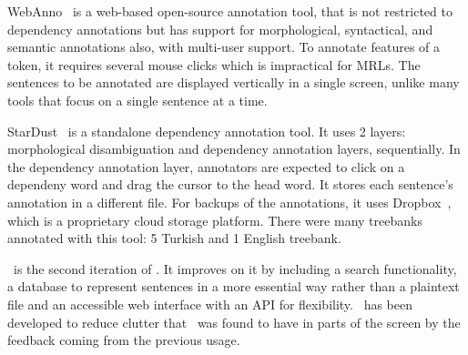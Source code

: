 WebAnno~\cite{webanno} is a web-based open-source annotation tool, that is not restricted to dependency annotations but has support for morphological, syntactical, and semantic annotations also, with multi-user support.
To annotate features of a token, it requires several mouse clicks which is impractical for MRLs.
The sentences to be annotated are displayed vertically in a single screen, unlike many tools that focus on a single sentence at a time.

StarDust~\cite{stardust} is a standalone dependency annotation tool. It uses 2 layers: morphological disambiguation and dependency annotation layers, sequentially. In the dependency annotation layer, annotators are expected to click on a dependeny word and drag the cursor to the head word. It stores each sentence's annotation in a different file. For backups of the annotations, it uses Dropbox~\cite{dropbox}, which is a proprietary cloud storage platform. There were many treebanks annotated with this tool: 5 Turkish and 1 English treebank.

\boatvtwo\ is the second iteration of \boatvone.
It improves on it by including a search functionality, a database to represent sentences in a more essential way rather than a plaintext file and an accessible web interface with an API for flexibility.
\boatvtwo\ has been developed to reduce clutter that \boatvone\ was found to have in parts of the screen by the feedback coming from the previous \boatvone usage.

